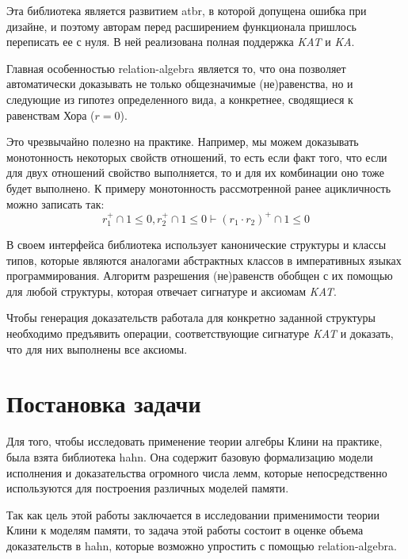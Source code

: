 \documentclass[times
              ]{itmo-student-thesis}
\begin{document}
      Эта библиотека является развитием atbr, в которой допущена ошибка при дизайне, и поэтому
      авторам перед расширением функционала пришлось переписать ее с нуля. В ней реализована полная
      поддержка \textit{KAT} и \textit{KA}.

      Главная особенностью relation-algebra является то, что она позволяет автоматически доказывать
      не только общезначимые (не)равенства, но и следующие из гипотез определенного вида, а
      конкретнее, сводящиеся к равенствам Хора ($ r = 0 $).

      Это чрезвычайно полезно на практике.
      Например, мы можем доказывать монотонность некоторых свойств отношений,
      то есть если факт того, что если для двух отношений свойство выполняется, то и для их комбинации
      оно тоже будет выполнено.
      К примеру монотонность рассмотренной ранее ацикличность можно записать так:
      $$ r_1^+ \cap 1 \leq 0, r_2^+ \cap 1 \leq 0 \vdash (r_1 \cdot r_2)^+ \cap 1 \leq 0 $$

      В своем интерфейса библиотека использует канонические структуры и классы типов, которые являются
      аналогами абстрактных классов в императивных языках программирования.
      Алгоритм разрешения (не)равенств обобщен с их помощью для любой структуры, которая отвечает
      сигнатуре и аксиомам \textit{KAT}.

      Чтобы генерация доказательств работала для конкретно заданной структуры необходимо предъявить
      операции, соответствующие сигнатуре \textit{KAT} и доказать, что для них выполнены все аксиомы.

\finishrelatedwork

  \section{Постановка задачи}


    Для того, чтобы исследовать применение теории алгебры Клини на практике, была взята библиотека hahn\cite{hahn}.
    Она содержит базовую формализацию модели исполнения и доказательства огромного числа лемм, которые
    непосредственно используются для построения различных моделей памяти\cite{imm}.

    Так как цель этой работы заключается в исследовании применимости теории Клини к моделям памяти,
    то задача этой работы состоит в оценке объема доказательств в hahn, которые возможно упростить с помощью relation-algebra.
\end{document}

